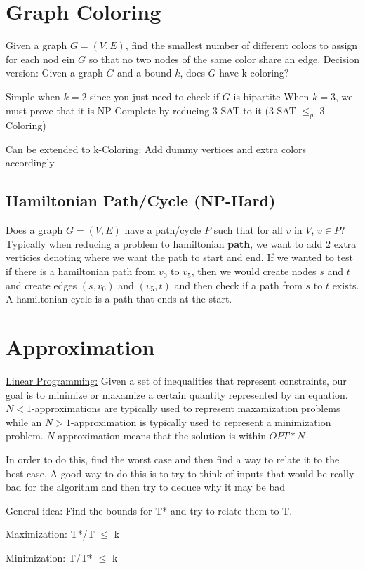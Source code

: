 \documentclass{article}
\begin{document}
\section{Graph Coloring}
Given a graph $G = (V, E)$, find the smallest number of different colors to assign for 
each nod ein $G$ so that no two nodes of the same color share an edge. Decision version: 
Given a graph $G$ and a bound $k$, does $G$ have k-coloring?

Simple when $k=2$ since you just need to check if $G$ is bipartite
When $k=3$, we must prove that it is NP-Complete by reducing 3-SAT to it (3-SAT $\leq_p$ 3-Coloring)

Can be extended to k-Coloring: Add dummy vertices and extra colors accordingly.
\subsection{Hamiltonian Path/Cycle (NP-Hard)}
Does a graph $G = (V, E)$ have a path/cycle $P$ such that for all $v$ in $V$, $v \in P$?
Typically when reducing a problem to hamiltonian \textbf{path}, we want to add 2 extra verticies denoting
where we want the path to start and end. If we wanted to test if there is a hamiltonian path from 
$v_0$ to $v_5$, then we would create nodes $s$ and $t$ and create edges $(s, v_0)$ and $(v_5, t)$
and then check if a path from $s$ to $t$ exists. A hamiltonian cycle is a path that ends at the
start.

\section{Approximation}
\underline{Linear Programming:} Given a set of inequalities that represent constraints, our
goal is to minimize or maxamize a certain quantity represented 
by an equation.
$N<1$-approximations are typically used to represent maxamization problems while
an $N>1$-approximation is typically used to represent a minimization problem. 
$N$-approximation means that the solution is within $OPT*N$

In order to do this, find the worst case and then find a way to relate it to the best case.
A good way to do this is to try to think of inputs that would be really bad for the algorithm
and then try to deduce why it may be bad

General idea: Find the bounds for T* and try to relate them to T.

Maximization: T*/T $\leq$ k

Minimization: T/T* $\leq$ k
\end{document}
